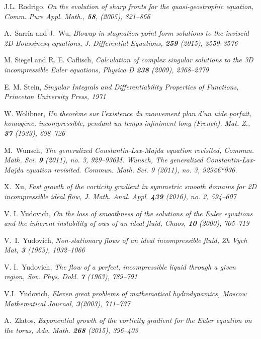 \documentclass[reqno,centertags, 11pt]{amsart}
\begin{document}
\begin{thebibliography}{99}
J.L. Rodrigo, \it On the evolution of sharp fronts for the
quasi-geostrophic equation, \rm
Comm. Pure Appl. Math., {\bf 58},
(2005), 821--866

 A.~Sarria and J.~Wu, \it Blowup in stagnation-point form solutions to the inviscid 2D Boussinesq equations,
\rm J. Differential Equations, {\bf 259} (2015), 3559--3576

 M. Siegel and R. E. Caflisch, \it Calculation of complex singular solutions to the 3D incompressible
Euler equations, \rm Physica D {\bf 238} (2009), 2368--2379

 E. M. Stein, \it Singular Integrals and Differentiability Properties of Functions, \rm Princeton University Press, 1971

 W. Wolibner, \it Un theor\`eme sur l'existence du mouvement plan d'un
uide parfait, homog\`ene,
incompressible, pendant un temps infiniment long (French), \rm Mat. Z., {\bf 37} (1933), 698--726

 M.~Wunsch, \it The generalized Constantin-Lax-Majda equation revisited, \rm Commun. Math.
Sci. {\bf 9} (2011), no. 3, 929--936M. Wunsch, The generalized Constantin-Lax-Majda equation revisited. Commun. Math.
Sci. 9 (2011), no. 3, 929â€“936.

 X.~Xu, \it Fast growth of the vorticity gradient in symmetric smooth domains for 2D incompressible ideal flow, \rm
J. Math. Anal. Appl. {\bf 439} (2016), no. 2, 594--607

 V. I. Yudovich, \it On the loss of smoothness of the solutions of the Euler equations and the
inherent instability of
ows of an ideal
fluid, \rm  Chaos, {\bf 10} (2000), 705--719

 V.~I.~Yudovich, \it Non-stationary flows of an ideal incompressible fluid, \rm Zh Vych Mat, {\bf 3} (1963), 1032--1066

 V. I.~Yudovich, \it The flow of a perfect, incompressible liquid through a given region, \rm
Sov. Phys. Dokl. {\bf 7} (1963), 789--791

 V.I.~Yudovich, \it Eleven great problems of mathematical hydrodynamics, \rm Moscow Mathematical Journal,
{\bf 3}(2003), 711--737

 A.~Zlatos, \it Exponential growth of the vorticity gradient for the Euler equation on the torus, \rm Adv. Math. {\bf 268} (2015), 396--403


\end{thebibliography}
\end{document}
